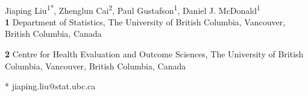 \documentclass[10pt,letterpaper]{article}
\begin{document}
\vspace*{0.2in}

\begin{flushleft}
{\Large
\textbf{} %
}
\newline
\\
Jiaping Liu\textsuperscript{1*},
Zhenglun Cai\textsuperscript{2},
Paul Gustafson\textsuperscript{1},
Daniel J. McDonald\textsuperscript{1}
\\
\bigskip
\textbf{1} Department of Statistics, The University of British Columbia, Vancouver, British Columbia, Canada

\textbf{2} Centre for Health Evaluation and Outcome Sciences, The University of British Columbia, Vancouver, British Columbia, Canada
\\

\bigskip

% 
%





* jiaping.liu@stat.ubc.ca

\end{flushleft}
\end{document}
